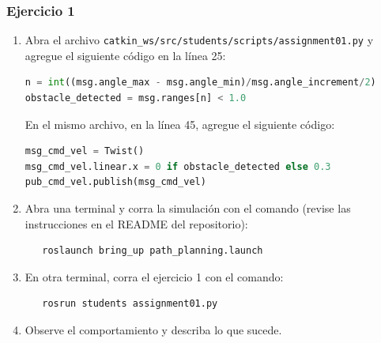 \begin{frame}[containsverbatim]\frametitle{Ejercicio 1}
  \begin{enumerate}
  \item Abra el archivo \texttt{catkin\_ws/src/students/scripts/assignment01.py} y agregue el siguiente código en la línea 25:
    \begin{lstlisting}[language=Python,firstnumber=25]
n = int((msg.angle_max - msg.angle_min)/msg.angle_increment/2)
obstacle_detected = msg.ranges[n] < 1.0
  \end{lstlisting}
  En el mismo archivo, en la línea 45, agregue el siguiente código:
  \begin{lstlisting}[language=Python,firstnumber=45]
msg_cmd_vel = Twist()
msg_cmd_vel.linear.x = 0 if obstacle_detected else 0.3
pub_cmd_vel.publish(msg_cmd_vel)
  \end{lstlisting}
  \item Abra una terminal y corra la simulación con el comando (revise las instrucciones en el README del repositorio):
    \begin{verbatim}
   roslaunch bring_up path_planning.launch
\end{verbatim}
  \item En otra terminal, corra el ejercicio 1 con el comando:
\begin{verbatim}
   rosrun students assignment01.py
\end{verbatim}
  \item Observe el comportamiento y describa lo que sucede. 
  \end{enumerate}
\end{frame}


